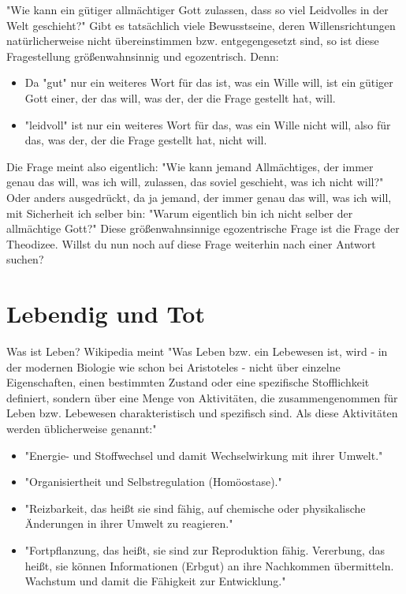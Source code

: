 \documentclass[12pt]{book}
\begin{document}
"Wie kann ein gütiger allmächtiger Gott zulassen, dass so viel Leidvolles in der Welt geschieht?" Gibt es tatsächlich viele Bewusstseine, deren Willensrichtungen natürlicherweise nicht übereinstimmen bzw. entgegengesetzt sind, so ist diese Fragestellung größenwahnsinnig und egozentrisch. Denn:
\begin{itemize}
\item Da "gut" nur ein weiteres Wort für das ist, was ein Wille will, ist ein gütiger Gott einer, der das will, was der, der die Frage gestellt hat, will.
\item "leidvoll" ist nur ein weiteres Wort für das, was ein Wille nicht will, also für das, was der, der die Frage gestellt hat, nicht will.
\end{itemize}

Die Frage meint also eigentlich: "Wie kann jemand Allmächtiges, der immer genau das will, was ich will, zulassen, das soviel geschieht, was ich nicht will?" Oder anders ausgedrückt, da ja jemand, der immer genau das will, was ich will, mit Sicherheit ich selber bin: "Warum eigentlich bin ich nicht selber der allmächtige Gott?" Diese größenwahnsinnige egozentrische Frage ist die Frage der Theodizee. Willst du nun noch auf diese Frage weiterhin nach einer Antwort suchen?

\section{Lebendig und Tot}

Was ist Leben? Wikipedia meint
"Was Leben bzw. ein Lebewesen ist, wird - in der modernen Biologie wie schon bei Aristoteles - nicht über einzelne Eigenschaften, einen bestimmten Zustand oder eine spezifische Stofflichkeit definiert, sondern über eine Menge von Aktivitäten, die zusammengenommen für Leben bzw. Lebewesen charakteristisch und spezifisch sind. Als diese Aktivitäten werden üblicherweise genannt:"
\begin{itemize}
\item "Energie- und Stoffwechsel und damit Wechselwirkung mit ihrer Umwelt."
\item "Organisiertheit und Selbstregulation (Homöostase)."
\item "Reizbarkeit, das heißt sie sind fähig, auf chemische oder physikalische Änderungen in ihrer Umwelt zu reagieren."
\item "Fortpflanzung, das heißt, sie sind zur Reproduktion fähig.
Vererbung, das heißt, sie können Informationen (Erbgut) an ihre Nachkommen übermitteln.
Wachstum und damit die Fähigkeit zur Entwicklung."
\end{itemize}
\end{document}
